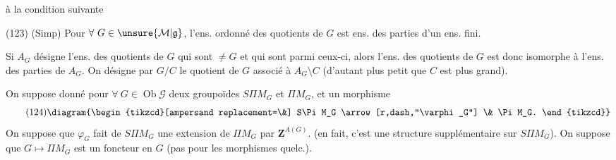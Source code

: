 à la condition suivante

(123) (Simp) Pour $\forall\ G\in\unsure{\mathcal M|\mathfrak g}$, l'ens. ordonné des quotients  de $G$ est   ens. des parties d'un ens. fini.

Si $A_G$ désigne l'ens. des quotients de $G$ qui sont $\ne G$ et qui sont  parmi ceux-ci, alors l'ens.  des quotients de $G$ est donc isomorphe à l'ens. des parties de $A_G$.  On désigne par $G/C$ le quotient de $G$ associé à $A_G\setminus C$ (d'autant plus petit que $C$ est plus grand).


On suppose donné pour $\forall\ G\in\operatorname{Ob}\mathcal G$ deux groupoïdes $S\Pi M_G$ et $\Pi M_G$, et un morphisme
\[
\tag{124}
\diagram{\begin{tikzcd}[ampersand replacement=\&]
S\Pi M_G \arrow[r,dash,"\varphi_G"] \& \Pi M_G.
\end{tikzcd}}
\]
On suppose que $\varphi_G$ fait de $S\Pi M_G$ une extension de $\Pi M_G$ par $\mathbf Z^{A(G)}$. (en fait, c'est une structure supplémentaire sur $S\Pi M_G$). On suppose que $G\mapsto\Pi M_G$ est un foncteur en $G$  (pas pour les morphismes quelc.).
